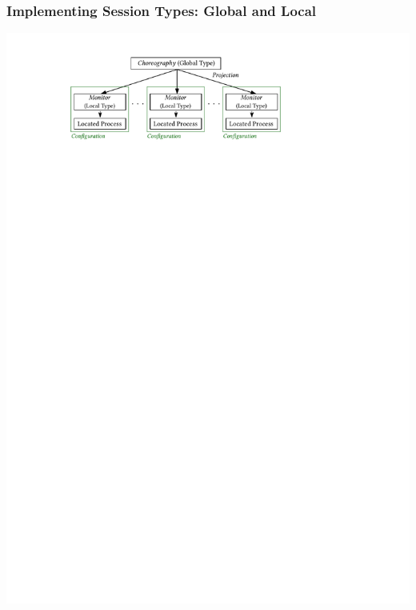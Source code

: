 \documentclass[12pt]{beamer}
\begin{document}
\begin{frame}[fragile]
\frametitle{Implementing Session Types: Global and Local}

\begin{center}
\includegraphics[scale=1.05]{figmodel}
\end{center}

\end{frame}
\end{document}
